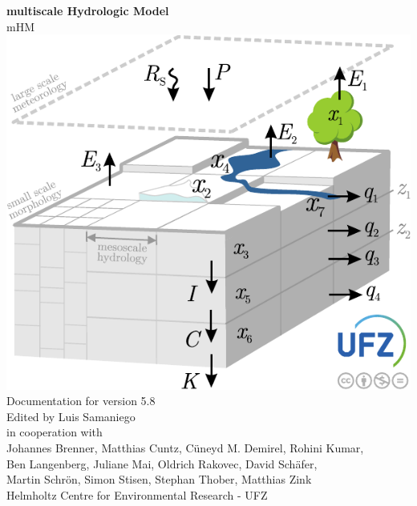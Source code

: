 \documentclass{book}
\begin{document}
\hypersetup{pageanchor=false,citecolor=blue}
\begin{titlepage}
\vspace*{2.0cm}
\begin{center}
{\Huge \bf multiscale Hydrologic Model}\\
\vspace*{1cm}
{\Huge mHM}\\
\vspace*{1cm}
\includegraphics[totalheight=5.0cm]{figures/mhm5-logo.pdf}\\
\vspace*{1.5cm}
{\Large Documentation for version 5.8}\\
\vspace*{2.5cm}
{\large Edited by Luis Samaniego}\\
\vspace*{0.5cm}
{\large in cooperation with}\\
\vspace*{0.5cm}
{\large 
Johannes Brenner,
Matthias Cuntz,
C\"uneyd M. Demirel,
Rohini Kumar,\\[1ex]
Ben Langenberg, 
Juliane Mai, 
Oldrich Rakovec, 
David Sch\"{a}fer,\\[1.2ex]
Martin Schr\"{o}n,
Simon Stisen,
Stephan Thober,
Matthias Zink }\\
\vspace*{2cm}
{\large Helmholtz Centre for Environmental Research - UFZ}\\
\vspace*{0.25cm}

\end{center}
\end{titlepage}
\end{document}
